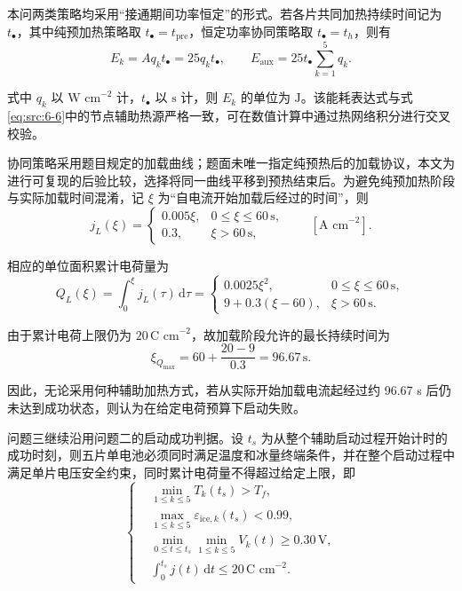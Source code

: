 \documentclass[bwprint]{gmcmthesis}
\numberwithin{equation}{section}
\numberwithin{figure}{section}
\begin{document}
 本问两类策略均采用“接通期间功率恒定”的形式。若各片共同加热持续时间记为 \(t_\bullet\)，其中纯预加热策略取 \(t_\bullet = t_{\text{pre}}\)，恒定功率协同策略取 \(t_\bullet = t_h\)，则有
\begin{equation}
E_k = A q_k t_\bullet = 25 q_k t_\bullet, \qquad E_{\text{aux}} = 25 t_\bullet \sum_{k=1}^5 q_k. \label{eq:src:6-15}
\end{equation}

 式中 \(q_k\) 以 \(\text{W cm}^{-2}\) 计，\(t_\bullet\) 以 \(\text{s}\) 计，则 \(E_k\) 的单位为 \(\text{J}\)。该能耗表达式与式\eqref{eq:src:6-6}中的节点辅助热源严格一致，可在数值计算中通过热网络积分进行交叉校验。

 协同策略采用题目规定的加载曲线；题面未唯一指定纯预热后的加载协议，本文为进行可复现的后验比较，选择将同一曲线平移到预热结束后。为避免纯预加热阶段与实际加载时间混淆，记 \(\xi\) 为“自电流开始加载后经过的时间”，则
\begin{equation}
j_L(\xi) = \begin{cases}
0.005\xi, & 0 \leq \xi \leq 60 \, \text{s}, \\
0.3, & \xi > 60 \, \text{s},
\end{cases} \qquad [\text{A cm}^{-2}]. \label{eq:src:6-16}
\end{equation}

 相应的单位面积累计电荷量为
\begin{equation}
Q_L(\xi) = \int_0^\xi j_L(\tau) \, \text{d}\tau = \begin{cases}
0.0025\xi^2, & 0 \leq \xi \leq 60 \, \text{s}, \\
9 + 0.3(\xi - 60), & \xi > 60 \, \text{s}.
\end{cases} \label{eq:src:6-17}
\end{equation}

 由于累计电荷上限仍为 \(20 \, \text{C cm}^{-2}\)，故加载阶段允许的最长持续时间为
\begin{equation}
\xi_{Q_{\text{max}}} = 60 + \frac{20 - 9}{0.3} = 96.67 \, \text{s}. \label{eq:src:6-18}
\end{equation}


 因此，无论采用何种辅助加热方式，若从实际开始加载电流起经过约 96.67 s 后仍未达到成功状态，则认为在给定电荷预算下启动失败。

 问题三继续沿用问题二的启动成功判据。设 \(t_s\) 为从整个辅助启动过程开始计时的成功时刻，则五片单电池必须同时满足温度和冰量终端条件，并在整个启动过程中满足单片电压安全约束，同时累计电荷量不得超过给定上限，即
\begin{equation}
\left\{
\begin{aligned}
& \min_{1 \leq k \leq 5} T_k(t_s) > T_f, \\
& \max_{1 \leq k \leq 5} \varepsilon_{\text{ice},k}(t_s) < 0.99, \\
& \min_{0 \leq t \leq t_s} \min_{1 \leq k \leq 5} V_k(t) \geq 0.30 \, \text{V}, \\
& \int_0^{t_s} j(t) \, \text{d}t \leq 20 \, \text{C cm}^{-2}.
\end{aligned}
\right.
\label{eq:src:6-19}
\end{equation}
\end{document}
